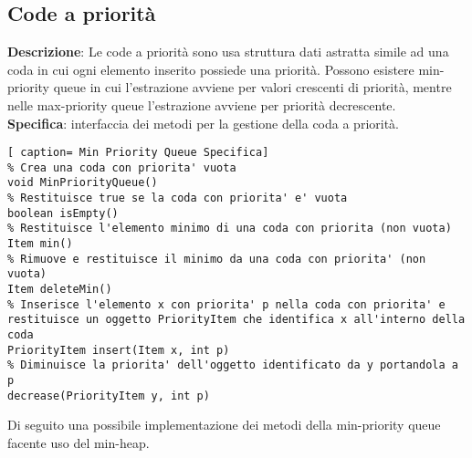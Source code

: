 \documentclass[../cheatSheetAlgoritmi.tex]{subfiles}
\begin{document}
\subsection{Code a priorità}
\textbf{Descrizione}: Le code a priorità sono usa struttura dati astratta simile ad una coda in cui ogni elemento inserito possiede una priorità. Possono esistere min-priority queue in cui l'estrazione avviene per valori crescenti di priorità, mentre nelle max-priority queue l'estrazione avviene per priorità decrescente.\\
\textbf{Specifica}: interfaccia dei metodi per la gestione della coda a priorità.\
\begin{lstlisting}[ caption= Min Priority Queue Specifica]
% Crea una coda con priorita' vuota
void MinPriorityQueue()
% Restituisce true se la coda con priorita' e' vuota
boolean isEmpty()  
% Restituisce l'elemento minimo di una coda con priorita (non vuota)
Item min()  
% Rimuove e restituisce il minimo da una coda con priorita' (non vuota)
Item deleteMin()  
% Inserisce l'elemento x con priorita' p nella coda con priorita' e restituisce un oggetto PriorityItem che identifica x all'interno della coda
PriorityItem insert(Item x, int p)
% Diminuisce la priorita' dell'oggetto identificato da y portandola a p	
decrease(PriorityItem y, int p) 
\end{lstlisting}
Di seguito una possibile implementazione dei metodi della min-priority queue facente uso del min-heap.
\end{document}
